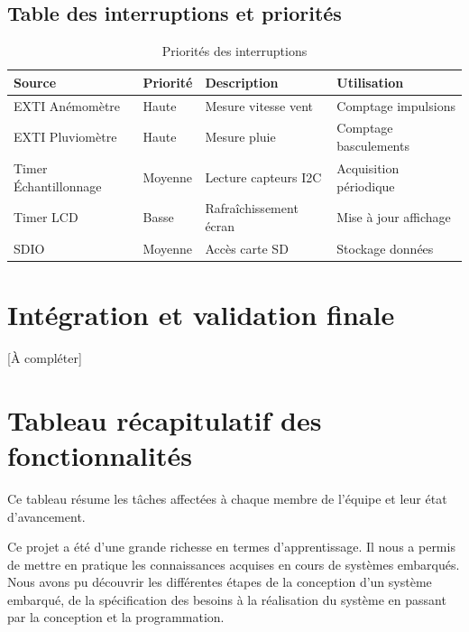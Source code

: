 \documentclass[12pt]{article}
\begin{document}
\subsection{Table des interruptions et priorités}
\begin{table}[H]
\centering
\caption{Priorités des interruptions}
\begin{tabular}{|l|l|l|l|}
\hline
\textbf{Source} & \textbf{Priorité} & \textbf{Description} & \textbf{Utilisation} \\
\hline
EXTI Anémomètre & Haute & Mesure vitesse vent & Comptage impulsions \\
\hline
EXTI Pluviomètre & Haute & Mesure pluie & Comptage basculements \\
\hline
Timer Échantillonnage & Moyenne & Lecture capteurs I2C & Acquisition périodique \\
\hline
Timer LCD & Basse & Rafraîchissement écran & Mise à jour affichage \\
\hline
SDIO & Moyenne & Accès carte SD & Stockage données \\
\hline
\end{tabular}
\end{table}

\section{Intégration et validation finale}
[À compléter]

\section{Tableau récapitulatif des fonctionnalités}
Ce tableau résume les tâches affectées à chaque membre de l'équipe et leur état d'avancement.

\begin{table}[htbp]
    \centering
    \caption{Tâches affectées et effectuées}
    \label{table:2}
\end{table}
\newpage
{}
Ce projet a été d'une grande richesse en termes d'apprentissage. Il nous a permis de mettre en pratique les connaissances acquises en cours de systèmes embarqués. Nous avons pu découvrir les différentes étapes de la conception d'un système embarqué, de la spécification des besoins à la réalisation du système en passant par la conception et la programmation.
\end{document}
